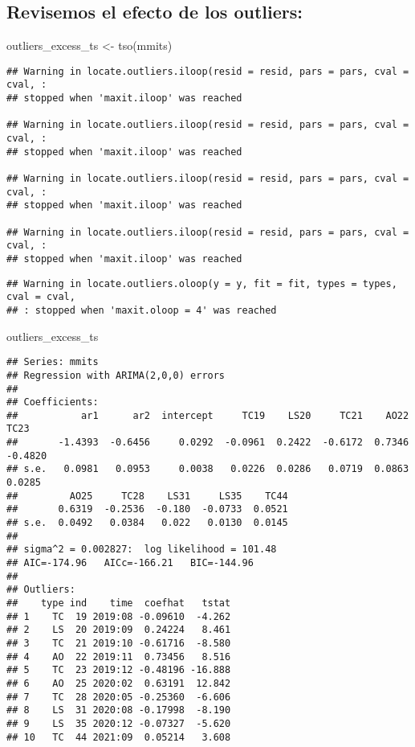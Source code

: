 \documentclass[
]{book}
\newenvironment{Shaded}{\begin{snugshade}}{\end{snugshade}}
\newcommand{\FunctionTok}[1]{\textcolor[rgb]{0.00,0.00,0.00}{#1}}
\newcommand{\NormalTok}[1]{#1}
\newcommand{\OtherTok}[1]{\textcolor[rgb]{0.56,0.35,0.01}{#1}}
\begin{document}
\hypertarget{revisemos-el-efecto-de-los-outliers}{%
\subsection{Revisemos el efecto de los outliers:}\label{revisemos-el-efecto-de-los-outliers}}

\begin{Shaded}
\begin{Highlighting}[]
\NormalTok{outliers\_excess\_ts }\OtherTok{\textless{}{-}} \FunctionTok{tso}\NormalTok{(mmits)}
\end{Highlighting}
\end{Shaded}

\begin{verbatim}
## Warning in locate.outliers.iloop(resid = resid, pars = pars, cval = cval, :
## stopped when 'maxit.iloop' was reached

## Warning in locate.outliers.iloop(resid = resid, pars = pars, cval = cval, :
## stopped when 'maxit.iloop' was reached

## Warning in locate.outliers.iloop(resid = resid, pars = pars, cval = cval, :
## stopped when 'maxit.iloop' was reached

## Warning in locate.outliers.iloop(resid = resid, pars = pars, cval = cval, :
## stopped when 'maxit.iloop' was reached
\end{verbatim}

\begin{verbatim}
## Warning in locate.outliers.oloop(y = y, fit = fit, types = types, cval = cval,
## : stopped when 'maxit.oloop = 4' was reached
\end{verbatim}

\begin{Shaded}
\begin{Highlighting}[]
\NormalTok{outliers\_excess\_ts}
\end{Highlighting}
\end{Shaded}

\begin{verbatim}
## Series: mmits 
## Regression with ARIMA(2,0,0) errors 
## 
## Coefficients:
##           ar1      ar2  intercept     TC19    LS20     TC21    AO22     TC23
##       -1.4393  -0.6456     0.0292  -0.0961  0.2422  -0.6172  0.7346  -0.4820
## s.e.   0.0981   0.0953     0.0038   0.0226  0.0286   0.0719  0.0863   0.0285
##         AO25     TC28    LS31     LS35    TC44
##       0.6319  -0.2536  -0.180  -0.0733  0.0521
## s.e.  0.0492   0.0384   0.022   0.0130  0.0145
## 
## sigma^2 = 0.002827:  log likelihood = 101.48
## AIC=-174.96   AICc=-166.21   BIC=-144.96
## 
## Outliers:
##    type ind    time  coefhat   tstat
## 1    TC  19 2019:08 -0.09610  -4.262
## 2    LS  20 2019:09  0.24224   8.461
## 3    TC  21 2019:10 -0.61716  -8.580
## 4    AO  22 2019:11  0.73456   8.516
## 5    TC  23 2019:12 -0.48196 -16.888
## 6    AO  25 2020:02  0.63191  12.842
## 7    TC  28 2020:05 -0.25360  -6.606
## 8    LS  31 2020:08 -0.17998  -8.190
## 9    LS  35 2020:12 -0.07327  -5.620
## 10   TC  44 2021:09  0.05214   3.608
\end{verbatim}
\end{document}
